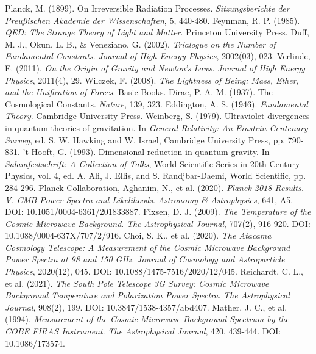 \documentclass[12pt,a4paper]{article}
\begin{document}
\begin{thebibliography}{99}
		 Planck, M. (1899). On Irreversible Radiation Processes. \textit{Sitzungsberichte der Preußischen Akademie der Wissenschaften}, 5, 440-480.
		 Feynman, R. P. (1985). \textit{QED: The Strange Theory of Light and Matter}. Princeton University Press.
		 Duff, M. J., Okun, L. B., \& Veneziano, G. (2002). \textit{Trialogue on the Number of Fundamental Constants}. \textit{Journal of High Energy Physics}, 2002(03), 023.
		 Verlinde, E. (2011). \textit{On the Origin of Gravity and Newton's Laws}. \textit{Journal of High Energy Physics}, 2011(4), 29.
		 Wilczek, F. (2008). \textit{The Lightness of Being: Mass, Ether, and the Unification of Forces}. Basic Books.
		 Dirac, P. A. M. (1937). The Cosmological Constants. \textit{Nature}, 139, 323.
		 Eddington, A. S. (1946). \textit{Fundamental Theory}. Cambridge University Press.
		 Weinberg, S. (1979). Ultraviolet divergences in quantum theories of gravitation. In \textit{General Relativity: An Einstein Centenary Survey}, ed. S. W. Hawking and W. Israel, Cambridge University Press, pp. 790-831.
		 't Hooft, G. (1993). Dimensional reduction in quantum gravity. In \textit{Salamfestschrift: A Collection of Talks}, World Scientific Series in 20th Century Physics, vol. 4, ed. A. Ali, J. Ellis, and S. Randjbar-Daemi, World Scientific, pp. 284-296.
		 Planck Collaboration, Aghanim, N., et al. (2020). \textit{Planck 2018 Results. V. CMB Power Spectra and Likelihoods}. \textit{Astronomy \& Astrophysics}, 641, A5. DOI: 10.1051/0004-6361/201833887.
		 Fixsen, D. J. (2009). \textit{The Temperature of the Cosmic Microwave Background}. \textit{The Astrophysical Journal}, 707(2), 916-920. DOI: 10.1088/0004-637X/707/2/916.
		 Choi, S. K., et al. (2020). \textit{The Atacama Cosmology Telescope: A Measurement of the Cosmic Microwave Background Power Spectra at 98 and 150 GHz}. \textit{Journal of Cosmology and Astroparticle Physics}, 2020(12), 045. DOI: 10.1088/1475-7516/2020/12/045.
		 Reichardt, C. L., et al. (2021). \textit{The South Pole Telescope 3G Survey: Cosmic Microwave Background Temperature and Polarization Power Spectra}. \textit{The Astrophysical Journal}, 908(2), 199. DOI: 10.3847/1538-4357/abd407.
		 Mather, J. C., et al. (1994). \textit{Measurement of the Cosmic Microwave Background Spectrum by the COBE FIRAS Instrument}. \textit{The Astrophysical Journal}, 420, 439-444. DOI: 10.1086/173574.

\end{thebibliography}
\end{document}
